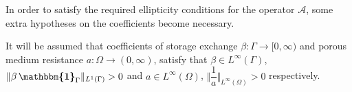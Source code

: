 \documentclass[3p]{elsarticle}
\newtheorem{lemma}[theorem]{Lemma}
\def\A{{\mathcal A}}
\def\B{{\mathcal B}}
\def\X{\mathbf X}
\def\Y{\mathbf Y}
\def\wtwo{\mathbf{w}_{2}}
\def\vone{\mathbf{v}_{1}}
\def\qtwo{q_{2}}
\def\rone{r_{1}}
\def\map{\mathcal{G} }%
\def\ind{\boldsymbol{\mathbbm{1}}}
\begin{document}
%
%
In order to satisfy the required ellipticity conditions for the operator $\A$, some extra hypotheses on the coefficients become necessary.
%
%
\begin{hypothesis}\label{Hyp non null local storage coefficient}
   It will be assumed that coefficients of storage exchange $\beta: \Gamma\rightarrow [0, \infty)$ and porous medium resistance $a: \Omega\rightarrow (0,\infty)$, satisfy that $\beta\in L^{\infty}(\Gamma)$, $\Vert \beta \, \ind_{\Gamma} \Vert_{L^{1} (\Gamma) }  > 0$ and $a\in L^{\infty}(\Omega)$, $\big\Vert \dfrac{1}{a}\big\Vert_{L^{\infty}(\Omega)}>0 $ respectively.
\end{hypothesis}
%
%
% 
%
\end{document}
